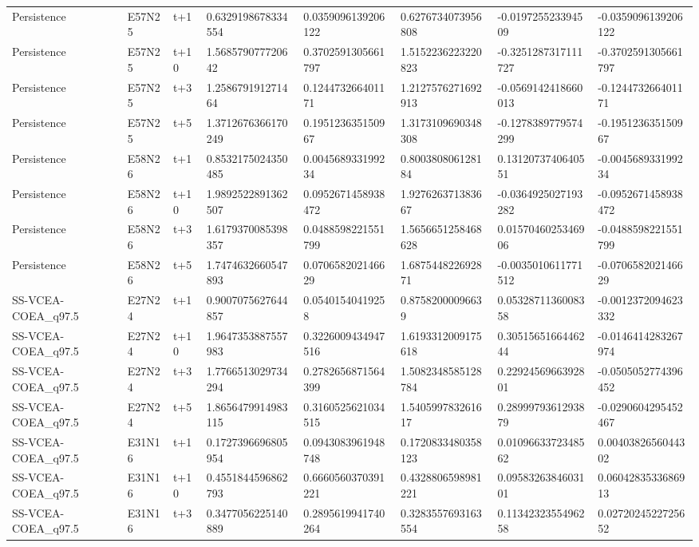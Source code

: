 \begin{landscape}
\begin{longtable}{llllllll}
Persistence & E57N25 & t+1 & 0.6329198678334554 & 0.0359096139206122 & 0.6276734073956808 & -0.019725523394509 & -0.0359096139206122 \\
Persistence & E57N25 & t+10 & 1.568579077720642 & 0.3702591305661797 & 1.5152236223220823 & -0.3251287317111727 & -0.3702591305661797 \\
Persistence & E57N25 & t+3 & 1.258679191271464 & 0.124473266401171 & 1.2127576271692913 & -0.0569142418660013 & -0.124473266401171 \\
Persistence & E57N25 & t+5 & 1.3712676366170249 & 0.195123635150967 & 1.3173109690348308 & -0.1278389779574299 & -0.195123635150967 \\
Persistence & E58N26 & t+1 & 0.8532175024350485 & 0.004568933199234 & 0.800380806128184 & 0.1312073740640551 & -0.004568933199234 \\
Persistence & E58N26 & t+10 & 1.9892522891362507 & 0.0952671458938472 & 1.927626371383667 & -0.0364925027193282 & -0.0952671458938472 \\
Persistence & E58N26 & t+3 & 1.6179370085398357 & 0.0488598221551799 & 1.5656651258468628 & 0.0157046025346906 & -0.0488598221551799 \\
Persistence & E58N26 & t+5 & 1.7474632660547893 & 0.070658202146629 & 1.687544822692871 & -0.0035010611771512 & -0.070658202146629 \\
SS-VCEA-COEA\_q97.5 & E27N24 & t+1 & 0.9007075627644857 & 0.05401540419258 & 0.87582000096639 & 0.0532871136008358 & -0.0012372094623332 \\
SS-VCEA-COEA\_q97.5 & E27N24 & t+10 & 1.9647353887557983 & 0.3226009434947516 & 1.6193312009175618 & 0.3051565166446244 & -0.0146414283267974 \\
SS-VCEA-COEA\_q97.5 & E27N24 & t+3 & 1.7766513029734294 & 0.2782656871564399 & 1.5082348585128784 & 0.2292456966392801 & -0.0505052774396452 \\
SS-VCEA-COEA\_q97.5 & E27N24 & t+5 & 1.8656479914983115 & 0.3160525621034515 & 1.540599783261617 & 0.2899979361293879 & -0.0290604295452467 \\
SS-VCEA-COEA\_q97.5 & E31N16 & t+1 & 0.1727396696805954 & 0.0943083961948748 & 0.1720833480358123 & 0.0109663372348562 & 0.0040382656044302 \\
SS-VCEA-COEA\_q97.5 & E31N16 & t+10 & 0.4551844596862793 & 0.6660560370391221 & 0.4328806598981221 & 0.0958326384603101 & 0.0604283533686913 \\
SS-VCEA-COEA\_q97.5 & E31N16 & t+3 & 0.3477056225140889 & 0.2895619941740264 & 0.3283557693163554 & 0.1134232355496258 & 0.0272024522725652 \\

\end{longtable}
\end{landscape}
